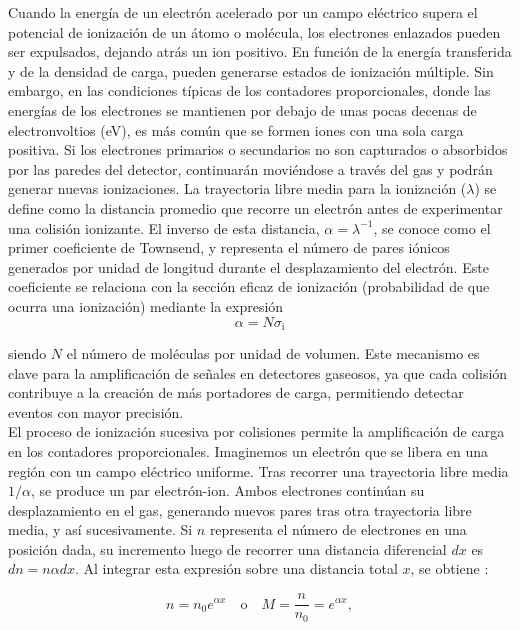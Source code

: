 \documentclass{report}
\begin{document}
\noindent Cuando la energía de un electrón acelerado por un campo eléctrico supera el potencial de ionización de un átomo o molécula, los electrones enlazados pueden ser expulsados, dejando atrás un ion positivo. En función de la energía transferida y de la densidad de carga, pueden generarse estados de ionización múltiple. Sin embargo, en las condiciones típicas de los contadores proporcionales, donde las energías de los electrones se mantienen por debajo de unas pocas decenas de electronvoltios (eV), es más común que se formen iones con una sola carga positiva. Si los electrones primarios o secundarios no son capturados o absorbidos por las paredes del detector, continuarán moviéndose a través del gas y podrán generar nuevas ionizaciones. La trayectoria libre media para la ionización ($\lambda$) se define como la distancia promedio que recorre un electrón antes de experimentar una colisión ionizante. El inverso de esta distancia, $\alpha = \lambda ^{-1}$, se conoce como el primer coeficiente de Townsend, y representa el número de pares iónicos generados por unidad de longitud durante el desplazamiento del electrón. Este coeficiente se relaciona con la sección eficaz de ionización (probabilidad de que ocurra una ionización) mediante la expresión 
\begin{equation}
    \alpha=N \sigma_{\mathrm{i}}
\end{equation}

\noindent siendo $N$ el número de moléculas por unidad de volumen. Este mecanismo es clave para la amplificación de señales en detectores gaseosos, ya que cada colisión contribuye a la creación de más portadores de carga, permitiendo detectar eventos con mayor precisión.\\

\noindent El proceso de ionización sucesiva por colisiones permite la amplificación de carga en los contadores proporcionales. Imaginemos un electrón que se libera en una región con un campo eléctrico uniforme. Tras recorrer una trayectoria libre media $1/\alpha$, se produce un par electrón-ion. Ambos electrones continúan su desplazamiento en el gas, generando nuevos pares tras otra trayectoria libre media, y así sucesivamente. Si $n$ representa el número de electrones en una posición dada, su incremento luego de recorrer una distancia diferencial $dx$ es $dn = n \alpha dx$. Al integrar esta expresión sobre una distancia total $x$, se obtiene \cite{raether1964electron}:

\begin{equation}
n = n_0 e^{\alpha x} \quad \text{o} \quad M = \frac{n}{n_0} = e^{\alpha x},
\label{eq:multiplication}
\end{equation}
\end{document}
